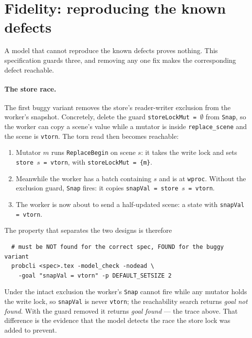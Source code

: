 \documentclass[a4paper,10pt,fleqn]{article}
\begin{document}
\section{Fidelity: reproducing the known defects}
\label{sec:fidelity}

A model that cannot reproduce the known defects proves nothing.  This
specification guards three, and removing any one fix makes the corresponding
defect reachable.

\paragraph{The store race.}
The first buggy variant removes the store's reader-writer exclusion from the
worker's snapshot.  Concretely, delete the guard \texttt{storeLockMut =
$\emptyset$} from \texttt{Snap}, so the worker can copy a scene's value while
a mutator is inside \texttt{replace\_scene} and the scene is \texttt{vtorn}.
The torn read then becomes reachable:

\begin{enumerate}
  \item Mutator $m$ runs \texttt{ReplaceBegin} on scene $s$: it takes the
    write lock and sets \texttt{store~$s$ = vtorn}, with
    \texttt{storeLockMut = \{m\}}.
  \item Meanwhile the worker has a batch containing $s$ and is at
    \texttt{wproc}.  Without the exclusion guard, \texttt{Snap} fires: it
    copies \texttt{snapVal = store~$s$ = vtorn}.
  \item The worker is now about to send a half-updated scene: a state with
    \texttt{snapVal = vtorn}.
\end{enumerate}

The property that separates the two designs is therefore
\begin{verbatim}
  # must be NOT found for the correct spec, FOUND for the buggy variant
  probcli <spec>.tex -model_check -nodead \
    -goal "snapVal = vtorn" -p DEFAULT_SETSIZE 2
\end{verbatim}
Under the intact exclusion the worker's \texttt{Snap} cannot fire while any
mutator holds the write lock, so \texttt{snapVal} is never \texttt{vtorn};
the reachability search returns \emph{goal not found}.  With the guard
removed it returns \emph{goal found} --- the trace above.  That difference
is the evidence that the model detects the race the store lock was added to
prevent.
\end{document}
